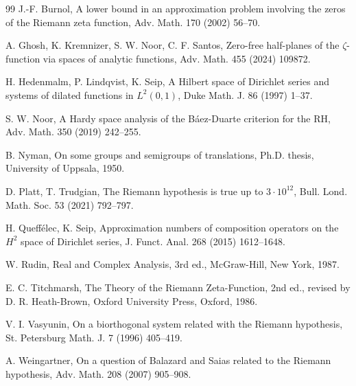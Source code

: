 \documentclass[11pt]{extarticle}
\numberwithin{equation}{section}
\theoremstyle{plain}
\theoremstyle{remark}
\begin{document}
\begin{thebibliography}{99}
J.-F. Burnol, A lower bound in an approximation problem involving the zeros of the
Riemann zeta function, Adv. Math. 170 (2002) 56--70.

A. Ghosh, K. Kremnizer, S. W. Noor, C. F. Santos, Zero-free half-planes of the
$\zeta$-function via spaces of analytic functions, Adv. Math. 455 (2024) 109872.

H. Hedenmalm, P. Lindqvist, K. Seip, A Hilbert space of Dirichlet series and systems
of dilated functions in $L^{2}(0,1)$, Duke Math. J. 86 (1997) 1--37.

S. W. Noor, A Hardy space analysis of the B\'aez-Duarte criterion for the RH, Adv.
Math. 350 (2019) 242--255.

B. Nyman, On some groups and semigroups of translations, Ph.D. thesis, University of
Uppsala, 1950.

D. Platt, T. Trudgian, The Riemann hypothesis is true up to $3 \cdot 10^{12}$, Bull.
Lond. Math. Soc. 53 (2021) 792--797.

H. Queff\'elec, K. Seip, Approximation numbers of composition operators on the $H^{2}$
space of Dirichlet series, J. Funct. Anal. 268 (2015) 1612--1648.

W. Rudin, Real and Complex Analysis, 3rd ed., McGraw-Hill, New York, 1987.

E. C. Titchmarsh, The Theory of the Riemann Zeta-Function, 2nd ed., revised by D. R.
Heath-Brown, Oxford University Press, Oxford, 1986.

V. I. Vasyunin, On a biorthogonal system related with the Riemann hypothesis, St.
Petersburg Math. J. 7 (1996) 405--419.

A. Weingartner, On a question of Balazard and Saias related to the Riemann hypothesis,
Adv. Math. 208 (2007) 905--908.

\end{thebibliography}
\end{document}
